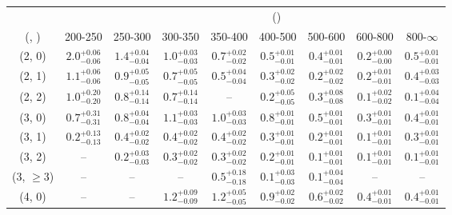 \begin{table}[h!]
\tiny
\centering
{}
\begin{tabular}
{ccccccccc}
	\hline\hline
&	& \multicolumn{8}{c}{\scalht (\gev)} \\ 
	 (\njet,  \nb) & 200-250 & 250-300 & 300-350 & 350-400 & 400-500 & 500-600 & 600-800 & 800-$\infty$ \\ [0.8ex] 
\hline
	(2, 0) & $2.0^{+ 0.06 }_{- 0.06 }$ & $1.4^{+ 0.04 }_{- 0.04 }$ & $1.0^{+ 0.03 }_{- 0.03 }$ & $0.7^{+ 0.02 }_{- 0.02 }$ & $0.5^{+ 0.01 }_{- 0.01 }$ & $0.4^{+ 0.01 }_{- 0.01 }$ & $0.2^{+ 0.00 }_{- 0.00 }$ & $0.5^{+ 0.01 }_{- 0.01 }$ \\[0.5ex] 
	(2, 1) & $1.1^{+ 0.06 }_{- 0.06 }$ & $0.9^{+ 0.05 }_{- 0.05 }$ & $0.7^{+ 0.05 }_{- 0.05 }$ & $0.5^{+ 0.04 }_{- 0.04 }$ & $0.3^{+ 0.02 }_{- 0.02 }$ & $0.2^{+ 0.02 }_{- 0.02 }$ & $0.2^{+ 0.01 }_{- 0.01 }$ & $0.4^{+ 0.03 }_{- 0.03 }$ \\[0.5ex] 
	(2, 2) & $1.0^{+ 0.20 }_{- 0.20 }$ & $0.8^{+ 0.14 }_{- 0.14 }$ & $0.7^{+ 0.14 }_{- 0.14 }$ & -- & $0.2^{+ 0.05 }_{- 0.05 }$ & $0.3^{+ 0.08 }_{- 0.08 }$ & $0.1^{+ 0.02 }_{- 0.02 }$ & $0.1^{+ 0.04 }_{- 0.04 }$ \\[0.5ex] 
	(3, 0) & $0.7^{+ 0.31 }_{- 0.31 }$ & $0.8^{+ 0.04 }_{- 0.04 }$ & $1.1^{+ 0.03 }_{- 0.03 }$ & $1.0^{+ 0.03 }_{- 0.03 }$ & $0.8^{+ 0.01 }_{- 0.01 }$ & $0.5^{+ 0.01 }_{- 0.01 }$ & $0.3^{+ 0.01 }_{- 0.01 }$ & $0.4^{+ 0.01 }_{- 0.01 }$ \\[0.5ex] 
	(3, 1) & $0.2^{+ 0.13 }_{- 0.13 }$ & $0.4^{+ 0.02 }_{- 0.02 }$ & $0.4^{+ 0.02 }_{- 0.02 }$ & $0.4^{+ 0.02 }_{- 0.02 }$ & $0.3^{+ 0.01 }_{- 0.01 }$ & $0.2^{+ 0.01 }_{- 0.01 }$ & $0.1^{+ 0.01 }_{- 0.01 }$ & $0.3^{+ 0.01 }_{- 0.01 }$ \\[0.5ex] 
	(3, 2) & -- & $0.2^{+ 0.03 }_{- 0.03 }$ & $0.3^{+ 0.02 }_{- 0.02 }$ & $0.3^{+ 0.02 }_{- 0.02 }$ & $0.2^{+ 0.01 }_{- 0.01 }$ & $0.1^{+ 0.01 }_{- 0.01 }$ & $0.1^{+ 0.01 }_{- 0.01 }$ & $0.1^{+ 0.01 }_{- 0.01 }$ \\[0.5ex] 
	(3, $\ge3$) & -- & -- & -- & $0.5^{+ 0.18 }_{- 0.18 }$ & $0.1^{+ 0.03 }_{- 0.03 }$ & $0.1^{+ 0.04 }_{- 0.04 }$ & -- & -- \\[0.5ex] 
	(4, 0) & -- & -- & $1.2^{+ 0.09 }_{- 0.09 }$ & $1.2^{+ 0.05 }_{- 0.05 }$ & $0.9^{+ 0.02 }_{- 0.02 }$ & $0.6^{+ 0.02 }_{- 0.02 }$ & $0.4^{+ 0.01 }_{- 0.01 }$ & $0.4^{+ 0.01 }_{- 0.01 }$ \\[0.5ex] 

\end{tabular}
\end{table}
